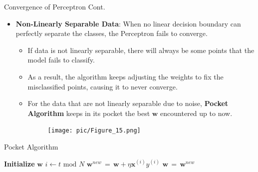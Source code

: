 \documentclass[serif, aspectratio=169]{beamer}
\begin{document}
    \begin{frame}{Convergence of Perceptron Cont.}
        \begin{itemize}\itemsep1.5em
        \item \textbf{Non-Linearly Separable Data}:
        When no linear decision boundary can perfectly separate the classes, the Perceptron fails to converge.
        \medskip
        \begin{itemize}\itemsep1em
        \item If data is not linearly separable, there will always be some points that the model fails to classify.
        \item As a result, the algorithm keeps adjusting the weights to fix the misclassified points, causing it to never converge.
        \item For the data that are not linearly separable due to noise, \textbf{Pocket Algorithm} keeps in its pocket the best \(\mathbf{w}\) encountered up to now.
        \endminipage
        \hspace{1.5cm}
        \begin{figure}
            \centering
            \texttt{[image: pic/Figure\_15.png]}
        \end{figure}
        \endminipage
        \end{itemize}
        \end{itemize}
        \vfill
    \end{frame}

    \begin{frame}{Pocket Algorithm}
        \begin{algorithm}[H]
            \caption{Pocket Algorithm}\label{alg:Pocket Algorithm}
            \begin{algorithmic}[1]
                \State \textbf{Initialize} $\mathbf{w}$
                    \State \(i \leftarrow t \text{ mod } N\)
                        \State \(\mathbf{w}^{new} \, = \, \mathbf{w} + \eta \mathbf{x}^{(i)}y^{(i)}\)
                         
                        \State \(\mathbf{w} \, = \, \mathbf{w}^{new}\)
                        \EndIf
                    \EndIf
                \EndFor
            \end{algorithmic}
        \end{algorithm}
    \end{frame}
\end{document}
